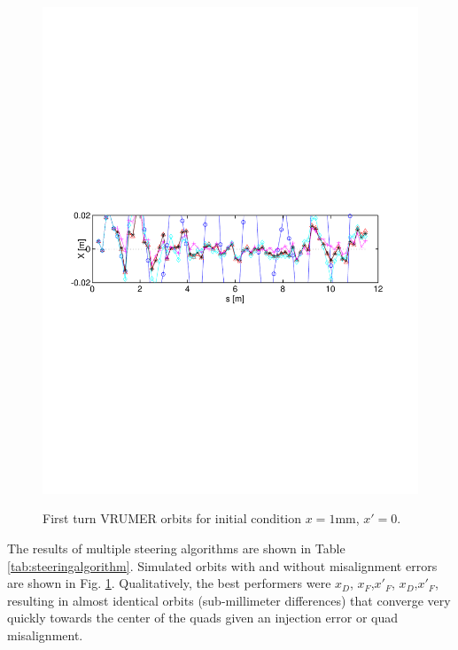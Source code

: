 \begin{figure}[!htb]
{	\includegraphics[width=\textwidth,trim={.5in 4.3in .7in 4.5in},clip]{4.figures/vrumer_steering_algorithm_compare_x1_xp0_sig5.pdf}}
\caption{First turn VRUMER orbits for initial condition $x=1$mm, $x'=0$. 
}
\label{fig:steeringalgorithm}
\end{figure}




The results of multiple steering algorithms are shown in Table \ref{tab:steeringalgorithm}. Simulated orbits with and without misalignment errors are shown in Fig. \ref{fig:steeringalgorithm}. Qualitatively, the best performers were $x_D$, $x_F$,$x'_F$, $x_D$,$x'_F$, resulting in almost identical orbits (sub-millimeter differences) that converge very quickly towards the center of the quads given an injection error or quad misalignment.

